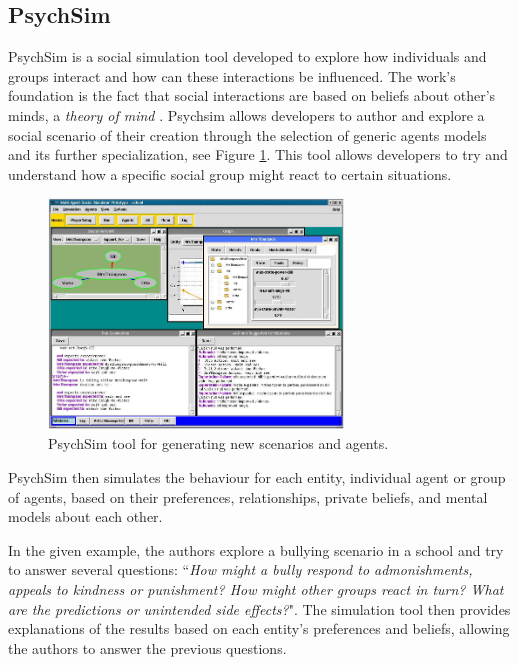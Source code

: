 \subsection{PsychSim}
\label{subsection:psychsim}

\noindent PsychSim \cite{marsella:psychsim} is a social simulation tool developed to explore how individuals and groups interact and how can these interactions be influenced.
The work's foundation is the fact that social interactions are based on beliefs about other's minds, a \textit{theory of mind} \cite{whiten:theoryofmind}.
Psychsim allows developers to author and explore a social scenario of their creation through the selection of generic agents models and its further specialization, see Figure \ref{fig:psychsim}.
This tool allows developers to try and understand how a specific social group might react to certain situations.

\begin{figure}
  \centering
  \includegraphics[width=0.7\textwidth]{./Images/psychsim}
  \caption{PsychSim tool for generating new scenarios and agents.}
  \label{fig:psychsim}
\end{figure}

PsychSim then simulates the behaviour for each entity, individual agent or group of agents, based on their preferences, relationships, private beliefs, and mental models about each other.

In the given example, the authors explore a bullying scenario in a school and try to answer several questions:
``\textit{How might a bully respond to admonishments, appeals to kindness or punishment? 
How might other groups react in turn? 
What are the predictions or unintended side effects?}".
The simulation tool then provides explanations of the results based on each entity's preferences and beliefs, allowing the authors to answer the previous questions.

